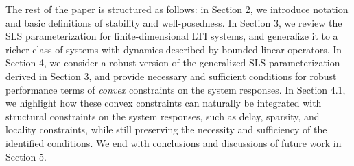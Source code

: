 The rest of the paper is structured as follows: in Section 2, we introduce notation and basic definitions of stability and well-posedness.  In Section 3, we review the SLS parameterization for finite-dimensional LTI systems, and generalize it to a richer class of systems with dynamics described by bounded linear operators.  In Section 4, we consider a robust version of the generalized SLS parameterization derived in Section 3, and provide necessary and sufficient conditions for robust performance terms of \emph{convex} constraints on the system responses.  In Section 4.1, we highlight how these convex constraints can naturally be integrated with structural constraints on the system responses, such as delay, sparsity, and locality constraints, while still preserving the necessity and sufficiency of the identified conditions.  We end with conclusions and discussions of future work in Section 5.
